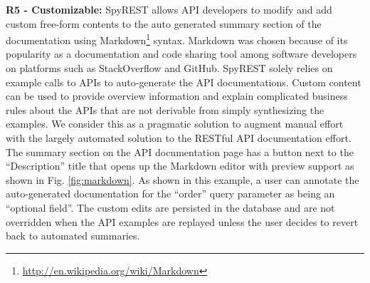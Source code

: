 \documentclass[conference]{IEEEtran}
\begin{document}
\textbf{R5 - Customizable:} SpyREST allows API developers to modify and add custom free-form contents to the auto generated summary section of the documentation using Markdown\footnote{\url{http://en.wikipedia.org/wiki/Markdown}} syntax. Markdown was chosen because of its popularity as a documentation and code sharing tool among software developers on platforms such as StackOverflow and GitHub. SpyREST solely relies on example calls to APIs to auto-generate the API documentations. Custom content can be used to provide overview information and explain complicated business rules about the APIs that are not derivable from simply synthesizing the examples. We consider this as a pragmatic solution to augment manual effort with the largely automated solution to the RESTful API documentation effort. The summary section on the API documentation page has a button next to the ``Description'' title that opens up the Markdown editor with preview support as shown in Fig. \ref{fig:markdown}. As shown in this example, a user can annotate the auto-generated documentation for the ``order'' query parameter as being an ``optional field''. The custom edits are persisted in the database and are not overridden when the API examples are replayed unless the user decides to revert back to automated summaries.
\end{document}
